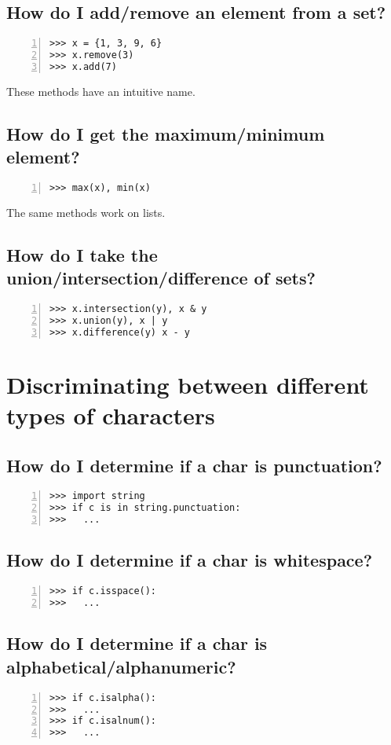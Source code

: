 \documentclass[12pt]{article}
\begin{document}
\subsection{How do I add/remove an element from a set?}
\begin{lstlisting}[numbers=left]
>>> x = {1, 3, 9, 6}
>>> x.remove(3)
>>> x.add(7)
\end{lstlisting}
These methods have an intuitive name.

\subsection{How do I get the maximum/minimum element?}
\begin{lstlisting}[numbers=left]
>>> max(x), min(x)
\end{lstlisting}
The same methods work on lists.

\subsection{How do I take the union/intersection/difference of sets?}
\begin{lstlisting}[numbers=left]
>>> x.intersection(y), x & y
>>> x.union(y), x | y
>>> x.difference(y) x - y
\end{lstlisting}

\section{Discriminating between different types of characters}
\subsection{How do I determine if a char is punctuation?}
\begin{lstlisting}[numbers=left]
>>> import string
>>> if c is in string.punctuation:
>>>   ...
\end{lstlisting}

\subsection{How do I determine if a char is whitespace?}
\begin{lstlisting}[numbers=left]
>>> if c.isspace():
>>>   ...
\end{lstlisting}

\subsection{How do I determine if a char is alphabetical/alphanumeric?}
\begin{lstlisting}[numbers=left]
>>> if c.isalpha():
>>>   ...
>>> if c.isalnum():
>>>   ...
\end{lstlisting}
\end{document}
